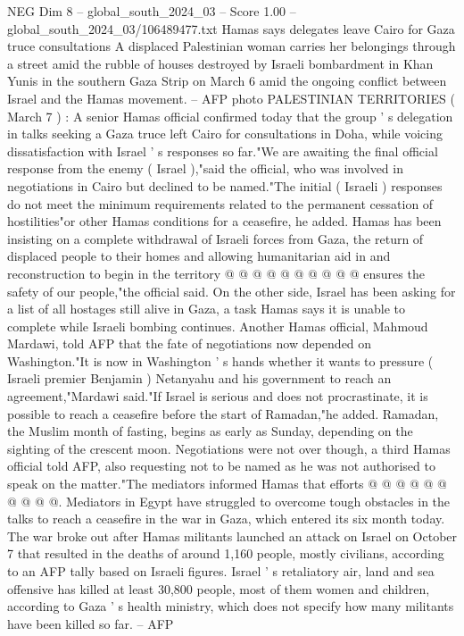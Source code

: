 \begin{textsample}{NEG Dim 8 – global\_south\_2024\_03 – Score 1.00 – global\_south\_2024\_03/106489477.txt}  \label{ex:f8_neg_364}
Hamas says delegates leave Cairo for Gaza truce consultations A displaced Palestinian woman carries her belongings through a street amid the rubble of houses destroyed by Israeli bombardment in Khan Yunis in the southern Gaza Strip on March 6 amid the ongoing conflict between Israel and the Hamas movement. -- AFP photo PALESTINIAN TERRITORIES ( March 7 ) : A senior Hamas official confirmed today that the group ' s delegation in talks seeking a Gaza truce left Cairo for consultations in Doha, while voicing dissatisfaction with Israel ' s responses so far."We are awaiting the final official response from the enemy ( Israel ),"said the official, who was involved in negotiations in Cairo but declined to be named."The initial ( Israeli ) responses do not meet the minimum requirements related to the permanent cessation of hostilities"or other Hamas conditions for a ceasefire, he added.
Hamas has been insisting on a complete withdrawal of Israeli forces from Gaza, the return of displaced people to their homes and allowing humanitarian aid in and reconstruction to begin in the territory @ @ @ @ @ @ @ @ @ @ ensures the safety of our people,"the official said.
On the other side, Israel has been asking for a list of all hostages still alive in Gaza, a task Hamas says it is unable to complete while Israeli bombing continues.
Another Hamas official, Mahmoud Mardawi, told AFP that the fate of negotiations now depended on Washington."It is now in Washington ' s hands whether it wants to pressure ( Israeli premier Benjamin ) Netanyahu and his government to reach an agreement,"Mardawi said."If Israel is serious and does not procrastinate, it is possible to reach a ceasefire before the start of Ramadan,"he added.
Ramadan, the Muslim month of fasting, begins as early as Sunday, depending on the sighting of the crescent moon.
Negotiations were not over though, a third Hamas official told AFP, also requesting not to be named as he was not authorised to speak on the matter."The mediators informed Hamas that efforts @ @ @ @ @ @ @ @ @ @.
Mediators in Egypt have struggled to overcome tough obstacles in the talks to reach a ceasefire in the war in Gaza, which entered its six month today.
The war broke out after Hamas militants launched an attack on Israel on October 7 that resulted in the deaths of around 1,160 people, mostly civilians, according to an AFP tally based on Israeli figures.
Israel ' s retaliatory air, land and sea offensive has killed at least 30,800 people, most of them women and children, according to Gaza ' s health ministry, which does not specify how many militants have been killed so far. -- AFP

\end{textsample}
